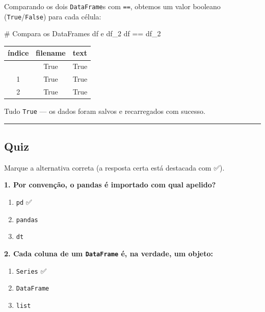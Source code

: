 \documentclass[
  brazilian,
  11pt,
]{article}
\newenvironment{Shaded}{\begin{snugshade}}{\end{snugshade}}
\newcommand{\CommentTok}[1]{\textcolor[rgb]{0.48,0.49,0.49}{#1}}
\newcommand{\NormalTok}[1]{\textcolor[rgb]{0.81,0.81,0.76}{#1}}
\newcommand{\OperatorTok}[1]{\textcolor[rgb]{0.81,0.81,0.76}{#1}}
\newcounter{none} %
\providecommand{\tightlist}{%
  \setlength{\itemsep}{0pt}\setlength{\parskip}{0pt}}
\let\oldtexttt\texttt
\renewcommand{\texttt}[1]{{\color{inlink}\oldtexttt{#1}}}
\begin{document}
Comparando os dois \texttt{DataFrame}s com \texttt{==}, obtemos um valor
booleano (\texttt{True}/\texttt{False}) para cada célula:

\begin{Shaded}
\begin{Highlighting}[]
\CommentTok{\# Compara os DataFrames \textquotesingle{}df\textquotesingle{} e \textquotesingle{}df\_2\textquotesingle{}}
\NormalTok{df }\OperatorTok{==}\NormalTok{ df\_2}
\end{Highlighting}
\end{Shaded}

{\def\LTcaptype{none} %
\begin{longtable}[]{@{}ccc@{}}
\toprule\noalign{}
índice & filename & text \\
\midrule\noalign{}
\endhead
\bottomrule\noalign{}
\endlastfoot
0 & True & True \\
1 & True & True \\
2 & True & True \\
\end{longtable}
}

Tudo \texttt{True} --- os dados foram salvos e recarregados com sucesso.

\begin{center}\rule{0.5\linewidth}{0.5pt}\end{center}

\subsection{Quiz}\label{quiz}

Marque a alternativa correta (a resposta certa está destacada com ✅).

\textbf{1. Por convenção, o pandas é importado com qual apelido?}

\begin{enumerate}
\def\labelenumi{\arabic{enumi}.}
\tightlist
\item
  \texttt{pd} ✅
\item
  \texttt{pandas}
\item
  \texttt{dt}
\end{enumerate}

\textbf{2. Cada coluna de um \texttt{DataFrame} é, na verdade, um
objeto:}

\begin{enumerate}
\def\labelenumi{\arabic{enumi}.}
\tightlist
\item
  \texttt{Series} ✅
\item
  \texttt{DataFrame}
\item
  \texttt{list}
\end{enumerate}
\end{document}
